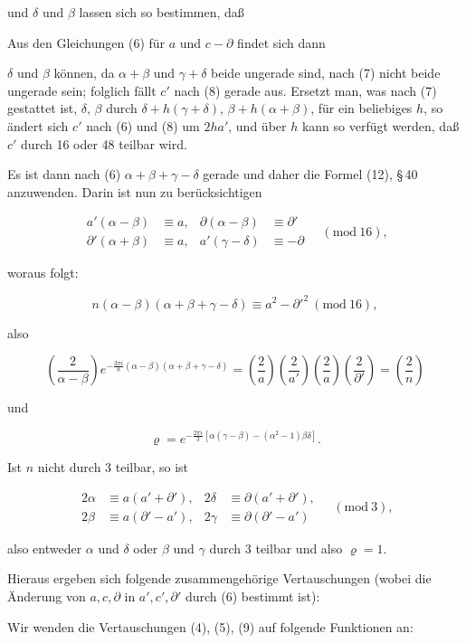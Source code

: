 und $\delta$ und $\beta$ lassen sich so bestimmen, daß


Aus den Gleichungen (6) für $a$ und $c-\partial$ findet sich dann


$\delta$ und $\beta$ können, da $\alpha+\beta$ und $\gamma+\delta$ beide ungerade sind,
nach (7) nicht beide ungerade sein; folglich fällt $c'$ nach (8)
gerade aus. Ersetzt man, was nach (7) gestattet ist, $\delta$, $\beta$ durch
$\delta+h(\gamma+\delta)$, $\beta+h(\alpha+\beta)$, für ein beliebiges $h$, so ändert
sich $c'$ nach (6) und (8) um $2ha'$, und über $h$ kann so verfügt
werden, daß $c'$ durch 16 oder 48 teilbar wird.

Es ist dann nach (6) $\alpha+\beta+\gamma-\delta$ gerade und daher
die Formel (12), \S\,40 anzuwenden. Darin ist nun zu berücksichtigen


\[
\begin{aligned}
a'(\alpha-\beta) &\equiv a, & \partial(\alpha-\beta) &\equiv \partial' \\
\partial'(\alpha+\beta) &\equiv a, & a'(\gamma-\delta) &\equiv -\partial
\end{aligned} \quad (\mathrm{mod}\ 16),
\]

woraus folgt:

\[
n(\alpha-\beta)(\alpha+\beta+\gamma-\delta) \equiv a^2 - \partial'^2 \ (\mathrm{mod}\ 16),
\]

also

\[
\left(\frac{2}{\alpha-\beta}\right) e^{-\frac{3\pi i}{8}(\alpha-\beta)(\alpha+\beta+\gamma-\delta)} = \left(\frac{2}{a}\right)\left(\frac{2}{a'}\right)\left(\frac{2}{a}\right)\left(\frac{2}{\partial'}\right) = \left(\frac{2}{n}\right)
\]

und

\[
\varrho = e^{-\frac{2\pi i}{3}\left[\alpha(\gamma-\beta)-(\alpha^2-1)\beta\delta\right]}.
\]

Ist $n$ nicht durch 3 teilbar, so ist

\[
\begin{aligned}
2\alpha &\equiv a(a'+\partial'), & 2\delta &\equiv \partial(a'+\partial'), \\
2\beta &\equiv a(\partial'-a'), & 2\gamma &\equiv \partial(\partial'-a')
\end{aligned} \quad (\mathrm{mod}\ 3),
\]

also entweder $\alpha$ und $\delta$ oder $\beta$ und $\gamma$ durch 3 teilbar und also
$\varrho = 1$.

Hieraus ergeben sich folgende zusammengehörige Vertauschungen
 (wobei die Änderung von $a, c, \partial$ in $a', c', \partial'$ durch (6)
bestimmt ist):


Wir wenden die Vertauschungen (4), (5), (9) auf folgende
Funktionen an:
